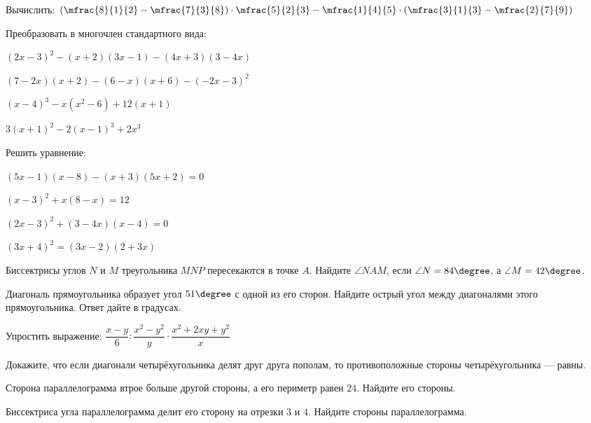 %
%
\begin{consultation}
	\begin{listofex}
		\item Вычислить: \( \left( \mfrac{8}{1}{2}-\mfrac{7}{3}{8} \right)\cdot\mfrac{5}{2}{3}-\mfrac{1}{4}{5}\cdot\left( \mfrac{3}{1}{3}-\mfrac{2}{7}{9} \right) \)
		\item Преобразовать в многочлен стандартного вида:
		\begin{enumcols}[itemcolumns=2]
			\item \( (2x-3)^2-(x+2)(3x-1)-(4x+3)(3-4x) \)
			\item \( (7-2x)(x+2)-(6-x)(x+6)-(-2x-3)^2 \)
			\item \( (x-4)^3-x(x^2-6)+12(x+1) \)
			\item \( 3(x+1)^2-2(x-1)^3+2x^3 \)
		\end{enumcols}
		\item Решить уравнение:
		\begin{enumcols}[itemcolumns=2]
			\item \( (5x-1)(x-8)-(x+3)(5x+2)=0 \)
			\item \( (x-3)^2+x(8-x)=12 \)
			\item \( (2x-3)^2+(3-4x)(x-4)=0 \)
			\item \( (3x+4)^2=(3x-2)(2+3x) \)
		\end{enumcols}
		\item Биссектрисы углов \( N \) и \( M \) треугольника \( MNP \) пересекаются в точке \( A \). Найдите \( \angle NAM \), если \( \angle N = 84\degree \), а \( \angle M = 42\degree \).
		\item Диагональ прямоугольника образует угол \( 51\degree \) с одной из его сторон. Найдите острый угол между диагоналями этого прямоугольника. Ответ дайте в градусах.
	\end{listofex}
\end{consultation}
\newpage
\begin{consultation}
	\begin{listofex}
		\item Упростить выражение: \( \dfrac{x-y}{6}:\dfrac{x^2-y^2}{y}\cdot\dfrac{x^2+2xy+y^2}{x} \)
		\item Докажите, что если диагонали четырёхугольника делят друг друга пополам, то противоположные стороны четырёхугольника --- равны.
		\item Сторона параллелограмма втрое больше другой стороны, а его периметр равен \( 24 \). Найдите его стороны.
		\item Биссектриса угла параллелограмма делит его сторону на отрезки \( 3 \) и \( 4 \). Найдите стороны параллелограмма.
		
	\end{listofex}
\end{consultation}